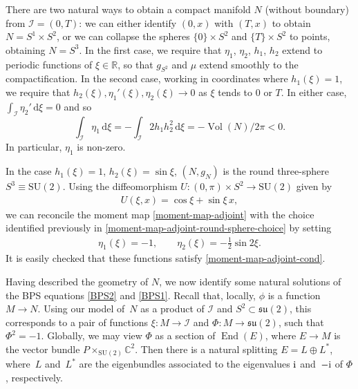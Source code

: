 \documentclass[10pt,a4paper]{amsart}
\newcommand{\II}{{\mathcal{I}}}
\newcommand{\su}{{\mathfrak{su}}}
\newcommand{\SU}{{\mathrm{SU}}}
\newcommand{\R}{{\mathbb{R}}}
\newcommand{\C}{{\mathbb{C}}}
\newcommand{\1}{{\mathbb{1}}}
\def \d{\mathrm{d}}
\numberwithin{equation}{section}
\begin{document}
There are two natural ways to obtain a compact manifold $N$ (without boundary) from \mbox{$\II=(0,T)$}: we can either identify $(0,x)$ with $(T,x)$ to obtain $N=S^1\times S^2$, or we can collapse the spheres $\{0\}\times S^2$ and $\{T\}\times S^2$ to points, obtaining $N=S^3$. In the first case, we require that $\eta_1$, $\eta_2$, $h_1$, $h_2$ extend to periodic functions of $\xi\in\R$, so that $g_{S^2}$ and $\mu$ extend smoothly to the compactification. In the second case, working in coordinates where $h_1(\xi)=1$, we require that $h_2(\xi), \eta_1'(\xi), \eta_2(\xi)\to 0$ as $\xi$ tends to $0$ or $T$. In either case, $\int_\II \eta_2'\,\d\xi=0$ and so
\begin{equation}\label{eta1 constraint}
\int_\II \eta_1\,\d\xi = -\int_\II 2 h_1h_2^2\,\d\xi=-\operatorname{Vol}(N)/2\pi<0.
\end{equation}
In particular, $\eta_1$ is non-zero.
\begin{Remark}
In the case $h_1(\xi)=1$, $h_2(\xi)=\sin\xi$, $(N,g_N)$ is the round three-sphere $S^3\equiv\SU(2)$. Using the diffeomorphism $U\colon (0,\pi)\times S^2\to\SU(2)$ given by
\begin{align*}
 U(\xi,x)=\cos\xi+\sin\xi\,x,
\end{align*}
we can reconcile the moment map \eqref{moment-map-adjoint} with the choice identified previously in \eqref{moment-map-adjoint-round-sphere-choice} by setting
\begin{align*}
 \eta_1(\xi)=-1,\qquad\eta_2(\xi)=-\tfrac{1}{2}\sin2\xi.
\end{align*}
It is easily checked that these functions satisfy \eqref{moment-map-adjoint-cond}.
\end{Remark}

Having described the geometry of $N$, we now identify some natural solutions of the BPS equations \eqref{BPS2} and \eqref{BPS1}. Recall that, locally, $\phi$ is a function $M\to N$. Using our model of~$N$ as a product of $\II$ and $S^2\subset \su(2)$, this corresponds to a pair of functions $\xi\colon M\to \II$ and $\Phi\colon M\to\su(2)$, such that $\Phi^2=-1$. Globally, we may view $\Phi$ as a section of $\operatorname{End}(E)$, where $E\to M$ is the vector bundle $P\times_{\SU(2)}\C^2$. Then there is a natural splitting $E=L\oplus L^\ast$, where~$L$ and~$L^\ast$ are the eigenbundles associated to the eigenvalues ${\rm i}$ and~$-{\rm i}$ of $\Phi$, respectively.
\end{document}
